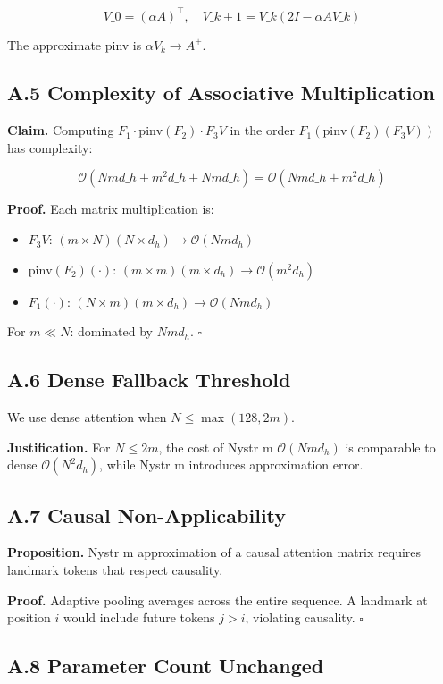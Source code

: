 \[
V\_0 = (\alpha A)^\top, \quad V\_{k+1} = V\_k (2I - \alpha A V\_k)
\tag{A.6}
\]

The approximate pinv is $\alpha V_k \to A^+$.

\subsection{A.5 Complexity of Associative Multiplication}

\textbf{Claim.} Computing $F_1 \cdot \text{pinv}(F_2) \cdot F_3 V$ in the order 
$F_1 (\text{pinv}(F_2) (F_3 V))$ has complexity:

\[
\mathcal{O}(N m d\_h + m^2 d\_h + N m d\_h) = \mathcal{O}(N m d\_h + m^2 d\_h)
\tag{A.7}
\]

\textbf{Proof.} Each matrix multiplication is:
\begin{itemize}
\item $F_3 V$: $(m \times N) (N \times d_h) \to \mathcal{O}(N m d_h)$
\item $\text{pinv}(F_2) (\cdot)$: $(m \times m) (m \times d_h) \to \mathcal{O}(m^2 d_h)$
\item $F_1 (\cdot)$: $(N \times m) (m \times d_h) \to \mathcal{O}(N m d_h)$

\end{itemize}
For $m \ll N$: dominated by $N m d_h$. $\square$

\subsection{A.6 Dense Fallback Threshold}

We use dense attention when $N \leq \max(128, 2m)$.

\textbf{Justification.} For $N \leq 2m$, the cost of Nystr m $\mathcal{O}(N m d_h)$ 
is comparable to dense $\mathcal{O}(N^2 d_h)$, while Nystr m introduces 
approximation error.

\subsection{A.7 Causal Non-Applicability}

\textbf{Proposition.} Nystr m approximation of a causal attention matrix 
requires landmark tokens that respect causality.

\textbf{Proof.} Adaptive pooling averages across the entire sequence. A landmark 
at position $i$ would include future tokens $j > i$, violating causality. $\square$

\subsection{A.8 Parameter Count Unchanged}

